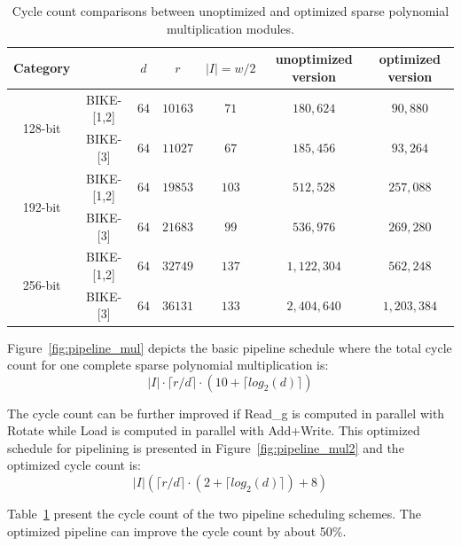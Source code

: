 \documentclass[runningheads]{llncs}
\begin{document}
\begin{table}[!tb]\centering
\caption{Cycle count comparisons between unoptimized and optimized sparse polynomial multiplication modules.}
\begin{tabular}{cc|ccccc}
  \hline
 \textbf{Category}        &             & $d$ & $r$  & $|I|=w/2$  & unoptimized version& optimized version\\\hline
\multirow{ 2}{*}{128-bit} &  BIKE-[1,2] & $64$ & $10163$  & $71$  & $180,624$ & $90,880$\\
                          &  BIKE-[3] & $64$ & $11027$  & $67$  & $185,456$& $93,264$\\
  \hline
\multirow{ 2}{*}{192-bit} &  BIKE-[1,2] & $64$ & $19853$  & $103$  &$512,528$& $257,088$\\
                          &  BIKE-[3] & $64$ & $21683$  & $99$  &$536,976$& $269,280$\\
  \hline
\multirow{ 2}{*}{256-bit} &  BIKE-[1,2] & $64$ & $32749$  & $137$  &$1,122,304$& $562,248$\\
                          &  BIKE-[3] & $64$ & $36131$  & $133$  &$2,404,640$& $1,203,384$\\
  \hline
\end{tabular}
\label{tab::sparse}
\end{table}

Figure~\ref{fig:pipeline_mul} depicts the basic pipeline schedule where the total cycle count for one complete sparse polynomial multiplication is:
\[
|I|\cdot\lceil r/d\rceil\cdot (10+\lceil log_2(d)\rceil)
\]

The cycle count can be further improved if Read\_g is computed in parallel
with Rotate while Load is computed in parallel with Add+Write.
This optimized schedule for pipelining is presented in Figure~\ref{fig:pipeline_mul2}
and the optimized cycle count is:
\[
|I|(\lceil r/d\rceil\cdot (2+\lceil log_2(d)\rceil) + 8)
\]

Table~\ref{tab::sparse} present the cycle count
of the two pipeline scheduling schemes. The optimized pipeline can improve the cycle count by about 50\%.
\end{document}
